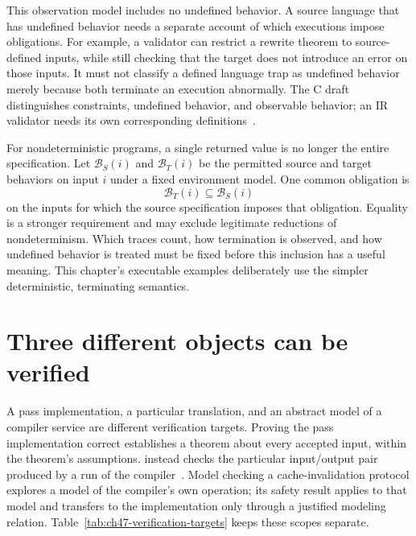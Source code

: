 This observation model includes no undefined behavior.
A source language that has undefined behavior needs a separate account of which executions impose obligations.
For example, a validator can restrict a rewrite theorem to source-defined inputs, while still checking that the target does not introduce an error on those inputs.
It must not classify a defined language trap as undefined behavior merely because both terminate an execution abnormally.
The C draft distinguishes constraints, undefined behavior, and observable behavior; an IR validator needs its own corresponding definitions~\cite{wg14-2011-c11}.

For nondeterministic programs, a single returned value is no longer the entire specification.
Let $\mathcal{B}_S(i)$ and $\mathcal{B}_T(i)$ be the permitted source and target behaviors on input $i$ under a fixed environment model.
One common  obligation is
\[
  \mathcal{B}_T(i)\subseteq\mathcal{B}_S(i)
\]
on the inputs for which the source specification imposes that obligation.
Equality is a stronger requirement and may exclude legitimate reductions of nondeterminism.
Which traces count, how termination is observed, and how undefined behavior is treated must be fixed before this inclusion has a useful meaning.
This chapter's executable examples deliberately use the simpler deterministic, terminating semantics.

\section{Three different objects can be verified}
\label{sec:ch47-three-objects}

A pass implementation, a particular translation, and an abstract model of a compiler service are different verification targets.
Proving the pass implementation correct establishes a theorem about every accepted input, within the theorem's assumptions.
 instead checks the particular input/output pair produced by a run of the compiler~\cite{pnueli-1998-validation}.
Model checking a cache-invalidation protocol explores a model of the compiler's own operation; its safety result applies to that model and transfers to the implementation only through a justified modeling relation.
Table~\ref{tab:ch47-verification-targets} keeps these scopes separate.

